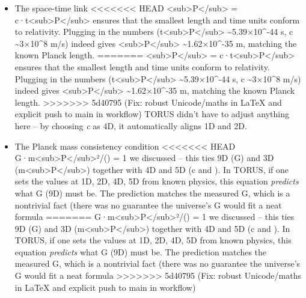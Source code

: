 \documentclass[]{article}
\begin{document}
{\begin{itemize}
\item
  The space-time link
<<<<<<< HEAD
  \ell\textless sub\textgreater P\textless/sub\textgreater{} =
  c·t\textless sub\textgreater P\textless/sub\textgreater\hspace{0pt}
  ensures that the smallest length and time units conform to relativity.
  Plugging in the numbers
  (t\textless sub\textgreater P\textless/sub\textgreater{}
  \textasciitilde5.39×10\^{}-44 s, c \textasciitilde3×10\^{}8 m/s)
  indeed gives \ell\textless sub\textgreater P\textless/sub\textgreater{}
  \textasciitilde1.62×10\^{}-35 m, matching the known Planck length.
=======
  \ell\textless{}sub\textgreater{}P\textless{}/sub\textgreater{} =
  c·t\textless{}sub\textgreater{}P\textless{}/sub\textgreater{}​ ensures
  that the smallest length and time units conform to relativity.
  Plugging in the numbers
  (t\textless{}sub\textgreater{}P\textless{}/sub\textgreater{}
  \textasciitilde{}5.39×10\^{}-44 s, c \textasciitilde{}3×10\^{}8 m/s)
  indeed gives
  \ell\textless{}sub\textgreater{}P\textless{}/sub\textgreater{}
  \textasciitilde{}1.62×10\^{}-35 m, matching the known Planck length.
>>>>>>> 5d40795 (Fix: robust Unicode/maths in LaTeX and explicit push to main in workflow)
  TORUS didn't have to adjust anything here -- by choosing \emph{c} as
  4D, it automatically aligns 1D and 2D.
\item
  The Planck mass consistency condition
<<<<<<< HEAD
  G·m\textless sub\textgreater P\textless/sub\textgreater²/(\hbarc) =
  1\hspace{0pt} we discussed -- this ties 9D (G) and 3D
  (m\textless sub\textgreater P\textless/sub\textgreater) together with
  4D and 5D (c and \hbar). In TORUS, if one sets the values at 1D, 2D, 4D,
  5D from known physics, this equation \emph{predicts} what G (9D) must
  be. The prediction matches the measured G, which is a nontrivial fact
  (there was no guarantee the universe's G would fit a neat formula
=======
  G·m\textless{}sub\textgreater{}P\textless{}/sub\textgreater{}²/(\hbarc) =
  1​ we discussed -- this ties 9D (G) and 3D
  (m\textless{}sub\textgreater{}P\textless{}/sub\textgreater{}) together
  with 4D and 5D (c and \hbar). In TORUS, if one sets the values at 1D, 2D,
  4D, 5D from known physics, this equation \emph{predicts} what G (9D)
  must be. The prediction matches the measured G, which is a nontrivial
  fact (there was no guarantee the universe's G would fit a neat formula
>>>>>>> 5d40795 (Fix: robust Unicode/maths in LaTeX and explicit push to main in workflow)

\end{itemize}}
\end{document}
